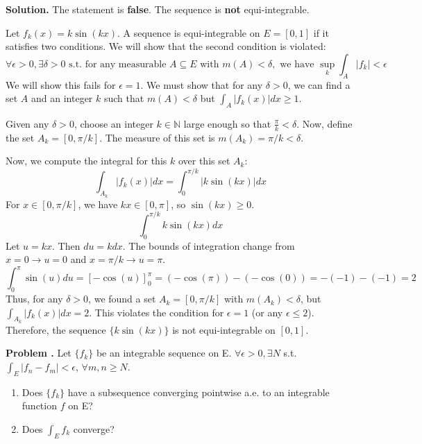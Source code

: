 \documentclass[12pt, a4paper, oneside]{article}
\newcounter{problemname}
\newenvironment{problem}
  {\begin{shaded}\stepcounter{problemname}\par\noindent\textbf{Problem \arabic{problemname}.
}\newline}
  {\end{shaded}\par}
\newenvironment{solution}
  {\par\noindent\textbf{Solution. }\newline}
  {\par}
\begin{document}
\begin{solution}
The statement is \textbf{false}. The sequence is \textbf{not} equi-integrable.

Let $f_k(x) = k \sin(kx)$. A sequence is equi-integrable on $E=[0,1]$ if it satisfies two conditions. We will show that the second condition is violated:
$$ \forall \epsilon > 0, \exists \delta > 0 \text{ s.t. for any measurable } A \subseteq E \text{ with } m(A) < \delta, \text{ we have } \sup_k \int_A |f_k| < \epsilon $$
We will show this fails for $\epsilon = 1$. We must show that for any $\delta > 0$, we can find a set $A$ and an integer $k$ such that $m(A) < \delta$ but $\int_A |f_k(x)| dx \ge 1$.

Given any $\delta > 0$, choose an integer $k \in \mathbb{N}$ large enough so that $\frac{\pi}{k} < \delta$.
Now, define the set $A_k = [0, \pi/k]$.
The measure of this set is $m(A_k) = \pi/k < \delta$.

Now, we compute the integral for this $k$ over this set $A_k$:
$$ \int_{A_k} |f_k(x)| dx = \int_0^{\pi/k} |k \sin(kx)| dx $$
For $x \in [0, \pi/k]$, we have $kx \in [0, \pi]$, so $\sin(kx) \ge 0$.
$$ \int_0^{\pi/k} k \sin(kx) dx $$
Let $u = kx$. Then $du = k dx$. The bounds of integration change from $x=0 \to u=0$ and $x=\pi/k \to u=\pi$.
$$ \int_0^\pi \sin(u) du = [-\cos(u)]_0^\pi = (-\cos(\pi)) - (-\cos(0)) = -(-1) - (-1) = 2 $$
Thus, for any $\delta > 0$, we found a set $A_k = [0, \pi/k]$ with $m(A_k) < \delta$, but $\int_{A_k} |f_k(x)| dx = 2$.
This violates the condition for $\epsilon = 1$ (or any $\epsilon \le 2$).
Therefore, the sequence $\{k \sin(kx)\}$ is not equi-integrable on $[0,1]$.
\end{solution}
\newpage
\begin{problem}
Let $\{f_k\}$ be an integrable sequence on E. $\forall \epsilon > 0, \exists N$ s.t. $\int_E |f_n - f_m|
< \epsilon$, $\forall m,n \ge N$.
\begin{enumerate}
\item  Does $\{f_k\}$ have a subsequence converging pointwise a.e.
to an integrable function $f$ on E?
\item  Does $\int_E f_k$ converge?
\end{enumerate}
\end{problem}
\end{document}
